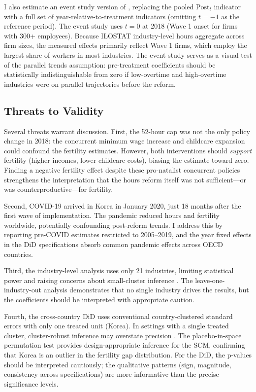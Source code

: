 \documentclass[12pt]{article}
\begin{document}
I also estimate an event study version of , replacing the pooled $\text{Post}_t$ indicator with a full set of year-relative-to-treatment indicators (omitting $t = -1$ as the reference period). The event study uses $t = 0$ at 2018 (Wave 1 onset for firms with 300+ employees). Because ILOSTAT industry-level hours aggregate across firm sizes, the measured effects primarily reflect Wave 1 firms, which employ the largest share of workers in most industries. The event study serves as a visual test of the parallel trends assumption: pre-treatment coefficients should be statistically indistinguishable from zero if low-overtime and high-overtime industries were on parallel trajectories before the reform.

\subsection{Threats to Validity}

Several threats warrant discussion. First, the 52-hour cap was not the only policy change in 2018: the concurrent minimum wage increase and childcare expansion could confound the fertility estimates. However, both interventions should \textit{support} fertility (higher incomes, lower childcare costs), biasing the estimate toward zero. Finding a negative fertility effect despite these pro-natalist concurrent policies strengthens the interpretation that the hours reform itself was not sufficient---or was counterproductive---for fertility.

Second, COVID-19 arrived in Korea in January 2020, just 18 months after the first wave of implementation. The pandemic reduced hours and fertility worldwide, potentially confounding post-reform trends. I address this by reporting pre-COVID estimates restricted to 2005--2019, and the year fixed effects in the DiD specifications absorb common pandemic effects across OECD countries.

Third, the industry-level analysis uses only 21 industries, limiting statistical power and raising concerns about small-cluster inference \citep{cameron2015practitioners}. The leave-one-industry-out analysis demonstrates that no single industry drives the results, but the coefficients should be interpreted with appropriate caution.

Fourth, the cross-country DiD uses conventional country-clustered standard errors with only one treated unit (Korea). In settings with a single treated cluster, cluster-robust inference may overstate precision \citep{conley2011inference, ferman2019inference}. The placebo-in-space permutation test provides design-appropriate inference for the SCM, confirming that Korea is an outlier in the fertility gap distribution. For the DiD, the p-values should be interpreted cautiously; the qualitative patterns (sign, magnitude, consistency across specifications) are more informative than the precise significance levels.
\end{document}
